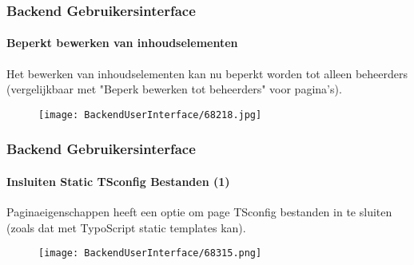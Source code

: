 \begin{frame}[fragile]
	\frametitle{Backend Gebruikersinterface}
	\framesubtitle{Beperkt bewerken van inhoudselementen}

	Het bewerken van inhoudselementen kan nu beperkt worden tot alleen beheerders
	(vergelijkbaar met "Beperk bewerken tot beheerders" voor pagina's).

	\begin{figure}
		\texttt{[image: BackendUserInterface/68218.jpg]}
	\end{figure}

\end{frame}

\begin{frame}[fragile]
	\frametitle{Backend Gebruikersinterface}
	\framesubtitle{Insluiten Static TSconfig Bestanden (1)}

	Paginaeigenschappen heeft een optie om page TSconfig bestanden in te
	sluiten (zoals dat met TypoScript static templates kan).

	\begin{figure}
		\texttt{[image: BackendUserInterface/68315.png]}
	\end{figure}

\end{frame}

